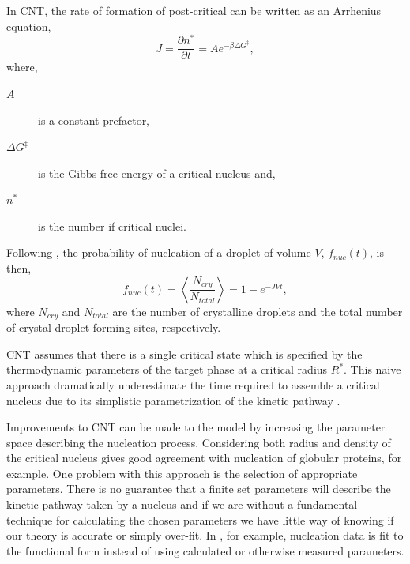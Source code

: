 \documentclass[showkeys, prb, reprint]{revtex4-1}
\newcommand{\f}{\frac}          %
\newcommand{\mean}[1]{\left\langle #1 \right\rangle}
\begin{document}

In CNT, the rate of formation of post-critical can be written as an Arrhenius
equation,
%
\begin{equation}
    J = \f{\partial n^*}{\partial t} = A e^{-\beta\Delta G^{\ddagger}},
\end{equation}
where,
\begin{description}
    \item[$A$] is a constant prefactor,
    \item[$\Delta G^\ddagger$] is the Gibbs free energy of a critical nucleus
        and, 
    \item[$n^*$] is the number if critical nuclei.
\end{description}
% 
Following \cite{MYERSON04}, the probability of nucleation of a droplet of
volume $V$, $f_{nuc}(t)$, is then,
%
\begin{equation}
    f_{nuc}(t) = \mean{\f{N_{cry}}{N_{total}}} = 1 - e^{-J V t},
\end{equation}
%
where $N_{cry}$ and $N_{total}$ are the number of crystalline droplets and the
total number of {\color{red} crystal droplet forming sites}, respectively.


CNT assumes that there is a single critical state which is specified by the
thermodynamic parameters of the target phase at a critical radius $R^*$. This
naive approach dramatically underestimate the time required to assemble a
critical nucleus due to its simplistic parametrization of the kinetic pathway
\cite{LUTSKO15, MYERSON04, MYERSON09}.

Improvements to CNT can be made to the model by increasing the parameter space
describing the nucleation process. Considering both radius and density of the
critical nucleus \cite{LUTSKO15} gives good agreement with nucleation of
globular proteins, for example. One problem with this approach is the selection
of appropriate parameters. There is no guarantee that a finite set parameters
will describe the kinetic pathway taken by a nucleus and if we are without a
fundamental technique for calculating the chosen parameters we have little way
of knowing if our theory is accurate or simply over-fit. In \cite{MYERSON09},
for example, nucleation data is fit to the functional form instead of using
calculated or otherwise measured parameters.

\end{document}
